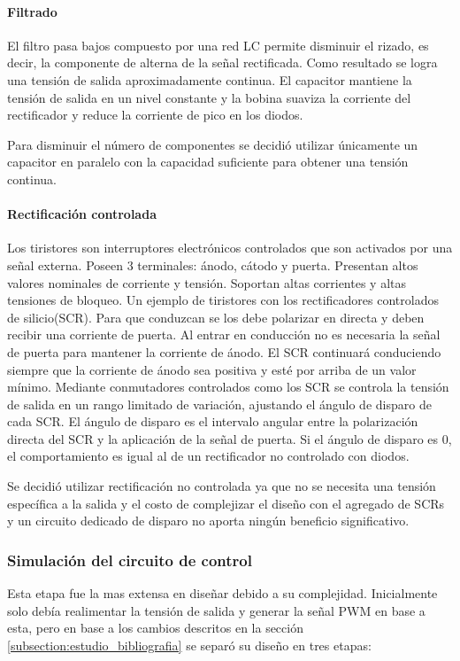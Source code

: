 \paragraph{Filtrado}
El filtro pasa bajos compuesto por una red LC permite disminuir el rizado,
es decir, la componente de alterna de la señal rectificada. 
Como resultado se logra una tensión de salida aproximadamente continua.
El capacitor mantiene la tensión de salida en un nivel constante y
la bobina suaviza la corriente del rectificador y reduce la corriente de pico en los diodos. 

Para disminuir el número de componentes se decidió utilizar únicamente
un capacitor en paralelo con la capacidad suficiente para obtener una tensión continua.

\paragraph{Rectificación controlada}

Los tiristores son interruptores electrónicos controlados que son activados por una señal externa. 
Poseen 3 terminales: ánodo, cátodo y puerta. Presentan altos valores nominales de corriente y tensión.
Soportan altas corrientes y altas tensiones de bloqueo. 
Un ejemplo de tiristores con los rectificadores controlados de silicio(SCR).
Para que conduzcan se los debe polarizar en directa y deben recibir una corriente de puerta. 
Al entrar en conducción no es necesaria la señal de puerta para mantener la corriente de ánodo. 
El SCR continuará conduciendo siempre que la corriente de ánodo sea positiva y esté por arriba de un valor mínimo. 
Mediante conmutadores controlados como los SCR se controla la tensión de salida en un rango limitado de variación, ajustando el ángulo de disparo de cada SCR. 
El ángulo de disparo es el intervalo angular entre la polarización directa del SCR y la aplicación de la señal de puerta. 
Si el ángulo de disparo es 0, el comportamiento es igual al de un rectificador no controlado con diodos. 

Se decidió utilizar rectificación no controlada ya que no se necesita una tensión específica a la salida
y el costo de complejizar el diseño con el agregado de SCRs y un circuito dedicado de disparo no aporta ningún beneficio significativo.

\subsubsection{Simulación del circuito de control}
Esta etapa fue la mas extensa en diseñar debido a su complejidad.
Inicialmente solo debía realimentar la tensión de salida y generar la señal PWM en base a esta,
pero en base a los cambios descritos en la sección \ref{subsection:estudio_bibliografia}
se separó su diseño en tres etapas:

